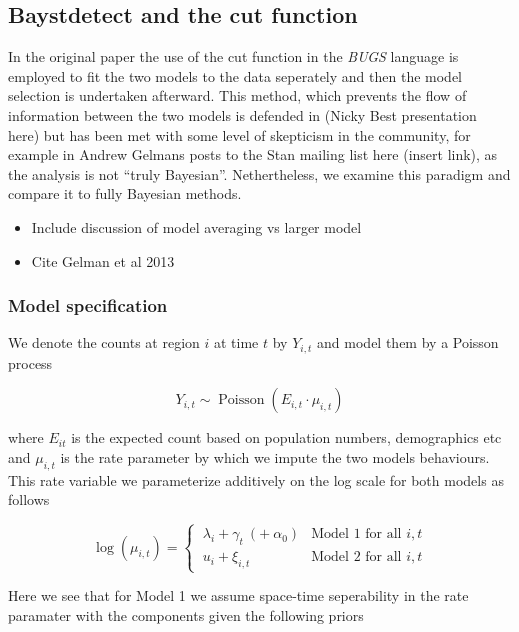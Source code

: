 \documentclass{article}
\begin{document}
\subsection{Baystdetect and the cut function}

In the original paper \cite{baystdetect} the use of the cut function in the \emph{BUGS} language is employed to fit the two models to the data seperately and then the model selection is undertaken afterward. This method, which prevents the flow of information between the two models is defended in (Nicky Best presentation here) but has been met with some level of skepticism in the community, for example in Andrew Gelmans posts to the Stan mailing list here (insert link), as the analysis is not ``truly Bayesian''. Nethertheless, we examine this paradigm and compare it to fully Bayesian methods. 

\begin{itemize}
\item Include discussion of model averaging vs larger model
\item Cite Gelman et al 2013
\end{itemize}

\subsubsection{Model specification}

We denote the counts at region $i$ at time $t$ by $Y_{i,t}$ and model them by a Poisson process

\begin{equation}
Y_{i,t} \sim \operatorname{Poisson}(E_{i,t} \cdot \mu_{i,t})
\end{equation}

where $E_{it}$ is the expected count based on population numbers, demographics etc and $\mu_{i,t}$ is the rate parameter by which we impute the two models behaviours. This rate variable we parameterize additively on the log scale for both models as follows

\begin{equation}
\log{(\mu_{i,t})} = \begin{cases}
\ \lambda_{i} + \gamma_{t} \  (+ \  \alpha_0) & \textrm{Model 1 for all } i, t \\
\ u_{i} + \xi_{i,t} & \textrm{Model 2 for all } i, t
\end{cases}
\end{equation} 

Here we see that for Model 1 we assume space-time seperability in the rate paramater with the components given the following priors
\end{document}
